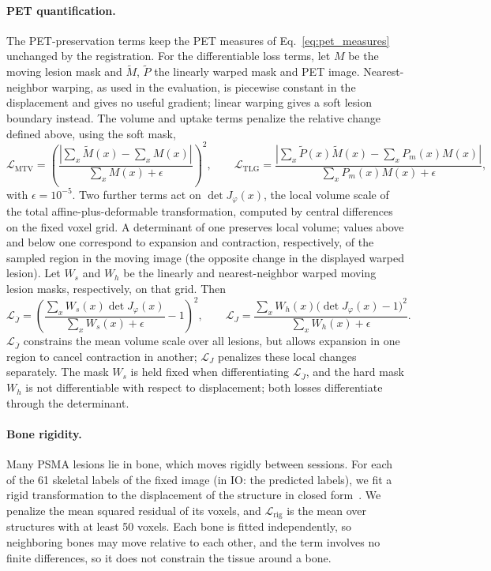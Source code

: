\paragraph{PET quantification.}
The PET-preservation terms keep the PET measures of Eq.~\eqref{eq:pet_measures} unchanged by the registration.
For the differentiable loss terms, let $M$ be the moving lesion mask and $\widetilde M$, $\widetilde P$ the linearly warped mask and PET image.
Nearest-neighbor warping, as used in the evaluation, is piecewise constant in the displacement and gives no useful gradient; linear warping gives a soft lesion boundary instead.
The volume and uptake terms penalize the relative change defined above, using the soft mask,
\begin{equation}
  \mathcal{L}_{\mathrm{MTV}} = \left(\frac{\left|\sum_x \widetilde M(x) - \sum_x M(x)\right|}{\sum_x M(x) + \epsilon}\right)^{2},
  \qquad
  \mathcal{L}_{\mathrm{TLG}} = \frac{\left|\sum_x \widetilde P(x)\widetilde M(x) - \sum_x P_m(x) M(x)\right|}{\sum_x P_m(x) M(x) + \epsilon},
  \label{eq:mtv_tlg}
\end{equation}
with $\epsilon=10^{-5}$.
Two further terms act on $\det J_\varphi(x)$, the local volume scale of the total affine-plus-deformable transformation, computed by central differences on the fixed voxel grid.
A determinant of one preserves local volume; values above and below one correspond to expansion and contraction, respectively, of the sampled region in the moving image (the opposite change in the displayed warped lesion).
Let $W_s$ and $W_h$ be the linearly and nearest-neighbor warped moving lesion masks, respectively, on that grid. Then
\begin{equation}
  \mathcal{L}_{\overline{J}} = \left(\frac{\sum_x W_s(x)\det J_\varphi(x)}{\sum_x W_s(x)+\epsilon} - 1\right)^{2},
  \qquad
  \mathcal{L}_{J} = \frac{\sum_x W_h(x)\bigl(\det J_\varphi(x) - 1\bigr)^{2}}{\sum_x W_h(x)+\epsilon}.
  \label{eq:jac_terms}
\end{equation}
$\mathcal{L}_{\overline{J}}$ constrains the mean volume scale over all lesions, but allows expansion in one region to cancel contraction in another; $\mathcal{L}_{J}$ penalizes these local changes separately.
The mask $W_s$ is held fixed when differentiating $\mathcal{L}_{\overline{J}}$, and the hard mask $W_h$ is not differentiable with respect to displacement; both losses differentiate through the determinant.

\paragraph{Bone rigidity.}
Many PSMA lesions lie in bone, which moves rigidly between sessions.
For each of the 61 skeletal labels of the fixed image (in IO: the predicted labels), we fit a rigid transformation to the displacement of the structure in closed form~\cite{ref_kabsch,ref_umeyama}.
We penalize the mean squared residual of its voxels, and $\mathcal{L}_{\mathrm{rig}}$ is the mean over structures with at least 50 voxels.
Each bone is fitted independently, so neighboring bones may move relative to each other, and the term involves no finite differences, so it does not constrain the tissue around a bone.

